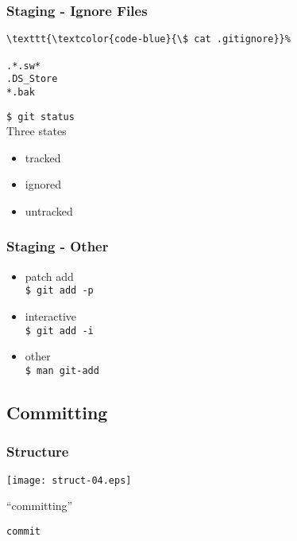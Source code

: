 \documentclass[english]{beamer}
\newcommand{\mysubsection}[2]{%
  \hypertarget{#2}{}%
  \subsection{#1}%
  \label{#2}%
}
\newcommand{\CMD}[1]{%
\texttt{\textcolor{code-blue}{#1}}%
}
\begin{document}
\begin{frame}[fragile]
\frametitle{Staging - Ignore Files}

\begin{Verbatim}[commandchars=\\\{\}]
\CMD{\$ cat .gitignore}
.*.sw*
.DS_Store
*.bak
\end{Verbatim}

\vspace{.1\textheight}
\CMD{\$ git status} \\
Three states
    \begin{itemize}
            \item tracked \\
            \item ignored \\
            \item untracked \\
    \end{itemize}

\end{frame}
\begin{frame}[fragile]
\frametitle{Staging - Other}

\vspace{.1\textheight}

\begin{itemize}
        \item patch add \\
                \CMD{\$ git add -p}
                \vspace{.1\textheight}
        \item interactive\\
                \CMD{\$ git add -i}
                \vspace{.1\textheight}
        \item other\\
                \CMD{\$ man git-add}

\end{itemize}
\end{frame}

\mysubsection{Committing}{using:committing}
\begin{frame}
\frametitle{Structure}

\texttt{[image: struct-04.eps]}
\vspace{\baselineskip}
\begin{center}
        ``committing''

        \vspace{\baselineskip}
        \CMD{commit}
\end{center}
\vspace{\textheight}
\end{frame}
\end{document}
